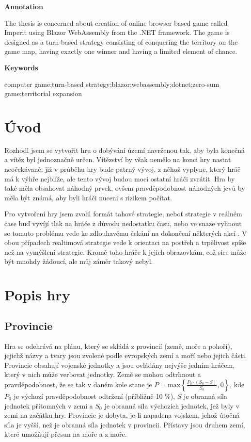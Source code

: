 \documentclass[a4paper,12pt]{article}
\def\max #1{\textrm{max}\left\{#1\right\}}
\begin{document}
\Large\textbf{Annotation}\normalsize

The thesis is concerned about creation of online browser-based game called Imperit using Blazor WebAssembly from the .NET framework. The game is designed as a turn-based strategy consisting of conquering the territory on the game map, having exactly one winner and having a limited element of chance.

\Large\textbf{Keywords}\normalsize

computer game;turn-based strategy;blazor;webassembly;dotnet;zero-sum game;territorial expansion
\newpage
\thispagestyle{empty}
\tableofcontents
\newpage
\section{Úvod}
Rozhodl jsem se vytvořit hru o dobývání území navrženou tak, aby byla konečná a vítěz byl jednoznačně určen. Vítězství by však nemělo na konci hry nastat neočekávaně, již v průběhu hry bude patrný vývoj, z něhož vyplyne, který hráč má k výhře nejblíže, ale tento vývoj budou moci ostatní hráči zvrátit. Hra by také měla obsahovat náhodný prvek, ovšem pravděpodobnost náhodných jevů by měla být známá, aby byli hráči nuceni s rizikem počítat.

Pro vytvoření hry jsem zvolil formát tahové strategie, neboť strategie v reálném čase buď vyvíjí tlak na hráče z důvodu nedostatku času, nebo ve snaze vyhnout se tomuto problému vede ke zdlouhavému čekání na dokončení některých akcí \cite{turnreal1}. V obou případech realtimová strategie vede k orientaci na postřeh a trpělivost spíše než na vymýšlení strategie\cite{turnreal2}. Kromě toho  hráče k jejich obrazovkám, což sice může být mnohdy žádoucí, ale můj záměr takový nebyl.

\section{Popis hry}
\subsection{Provincie}
Hra se odehrává na plánu, který se skládá z provincií (země, moře a pohoří), jejichž názvy a tvary jsou zvolené podle evropských zemí a moří nebo jejich části. Provincie obsahují vojenské jednotky a jsou ovládány nejvýše jedním hráčem, který v nich může verbovat jednotky. Země se mohou odtrhnout a pravděpodobnost, že se tak v daném kole stane je $P=\max{\displaystyle\frac{P_0\cdot (S_0-S)}{S_0},0}$, kde $P_0$ je výchozí pravděpodobnost odtržení (příbližně 10 \%), $S$ je obranná síla jednotek přítomných v zemi a $S_0$ je obranná síla výchozích jednotek, jež byly v zemi na začátku hry. Provincie je dobyta, je-li napadena vojskem, jehož útočná síla je vyšší, než je obranná síla jednotek v provincii. Přístavy jsou druhem zemí, které umožňují přesun na moře a z moře.
\end{document}
